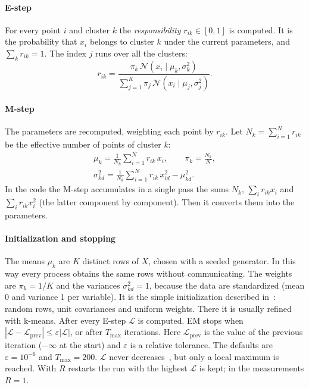 \documentclass[conference,onecolumn]{IEEEtran}
\begin{document}
\paragraph{E-step} For every point $i$ and cluster $k$ the \emph{responsibility} $r_{ik}\in[0,1]$ is computed. It is the probability that $x_i$ belongs to cluster $k$ under the current parameters, and $\sum_k r_{ik}=1$. The index $j$ runs over all the clusters:
\begin{equation}
r_{ik}=\frac{\pi_k\,\mathcal{N}(x_i\mid\mu_k,\sigma_k^2)}{\sum_{j=1}^{K}\pi_j\,\mathcal{N}(x_i\mid\mu_j,\sigma_j^2)}.
\end{equation}

\paragraph{M-step} The parameters are recomputed, weighting each point by $r_{ik}$. Let $N_k=\sum_{i=1}^{N}r_{ik}$ be the effective number of points of cluster $k$:
\begin{gather}
\mu_k=\tfrac{1}{N_k}\sum_{i=1}^{N} r_{ik}\,x_i,\qquad
\pi_k=\tfrac{N_k}{N},\\
\sigma^2_{kd}=\tfrac{1}{N_k}\sum_{i=1}^{N} r_{ik}\,x_{id}^2-\mu_{kd}^2.
\end{gather}
In the code the M-step accumulates in a single pass the sums $N_k$, $\sum_i r_{ik}x_i$ and $\sum_i r_{ik}x_i^2$ (the latter component by component). Then it converts them into the parameters.

\paragraph{Initialization and stopping} The means $\mu_k$ are $K$ distinct rows of $X$, chosen with a seeded generator. In this way every process obtains the same rows without communicating. The weights are $\pi_k=1/K$ and the variances $\sigma^2_{kd}=1$, because the data are standardized (mean 0 and variance 1 per variable). It is the simple initialization described in~\cite[Sec.~3]{sanderson}: random rows, unit covariances and uniform weights. There it is usually refined with k-means. After every E-step $\mathcal{L}$ is computed. EM stops when $|\mathcal{L}-\mathcal{L}_{\mathrm{prev}}|\le\varepsilon|\mathcal{L}|$, or after $T_{\max}$ iterations. Here $\mathcal{L}_{\mathrm{prev}}$ is the value of the previous iteration ($-\infty$ at the start) and $\varepsilon$ is a relative tolerance. The defaults are $\varepsilon=10^{-6}$ and $T_{\max}=200$. $\mathcal{L}$ never decreases~\cite[Sec.~9.4]{bishop}, but only a local maximum is reached. With $R$ restarts the run with the highest $\mathcal{L}$ is kept; in the measurements $R=1$.
\end{document}
